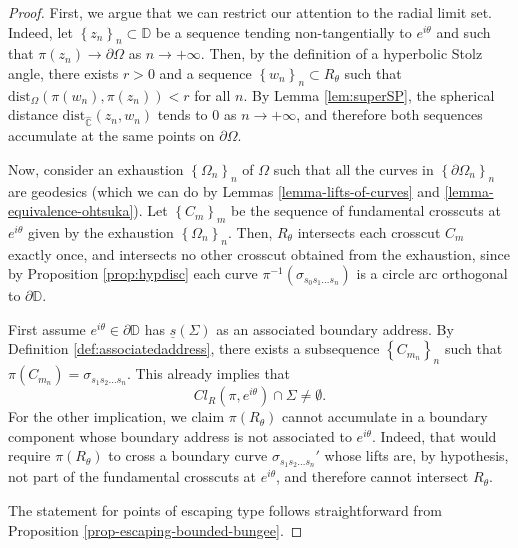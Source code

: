 \documentclass[11pt,a4paper,reqno]{amsart}
\theoremstyle{plain}
\theoremstyle{definition}
\theoremstyle{plain}
\def\Chat{\widehat{\mathbb{C}}}
\def\DD{\mathbb{D}}
\begin{document}
\begin{proof}
	First, we argue that we can restrict our attention to the radial limit set. Indeed, let $\left\lbrace z_n\right\rbrace _n\subset\DD$ be a sequence tending non-tangentially to $e^{i\theta}$ and such that $\pi(z_n)\to\partial\Omega$ as $n\to+\infty$. Then, by the definition of a hyperbolic Stolz angle, there exists $r > 0$ and a sequence $\left\lbrace w_n\right\rbrace _n\subset R_\theta$ such that $\textrm{dist}_\Omega(\pi(w_n), \pi(z_n)) < r$ for all $n$. By Lemma \ref{lem:superSP}, the spherical distance $\textrm{dist}_{\Chat}(z_n, w_n)$ tends to $ 0$ as $n\to+\infty$, and therefore both sequences accumulate at the same points on $ \partial\Omega $.

	Now, consider an exhaustion $ \left\lbrace \Omega_n\right\rbrace _n $ of $ \Omega $ such that all the curves in $ \left\lbrace \partial\Omega_n\right\rbrace _n $ are geodesics (which we can do by Lemmas \ref{lemma-lifts-of-curves} and \ref{lemma-equivalence-ohtsuka}). Let $ \left\lbrace C_m\right\rbrace _m $ be the sequence of fundamental crosscuts at $ e^{i\theta} $ given by the exhaustion  $ \left\lbrace \Omega_n\right\rbrace _n $. Then, $ R_\theta $ intersects each crosscut $ C_m $ exactly once, and intersects no other crosscut obtained from the exhaustion, since by Proposition \ref{prop:hypdisc} each curve $\pi^{-1}(\sigma_{s_0s_1\dots s_n})$ is a circle arc orthogonal to $\partial\DD$. 
	
	First assume $ e^{i\theta} \in\partial\mathbb{D}$ has $ \underline{s} (\Sigma)$ as an associated boundary address. By Definition \ref{def:associatedaddress}, there exists a subsequence $ \left\lbrace C_{m_n}\right\rbrace _n $ such that $ \pi(C_{m_n})=\sigma_{s_1s_2\dots s_n} $. This already implies that \[ Cl_R(\pi, e^{i\theta})\cap\Sigma \neq\emptyset.\] For the other implication, we claim $ \pi (R_\theta ) $ cannot accumulate in a boundary component whose boundary address is not associated to $ e^{i\theta} $. Indeed, that would require $\pi(R_\theta)$ to cross a boundary curve $\sigma_{s_1s_2\dots s_n}'$ whose lifts are, by hypothesis, not part of the fundamental crosscuts at $e^{i\theta}$, and therefore cannot intersect $R_\theta$.
	
	The statement for points of escaping type follows straightforward from Proposition \ref{prop-escaping-bounded-bungee}. 


\end{proof}
\end{document}
